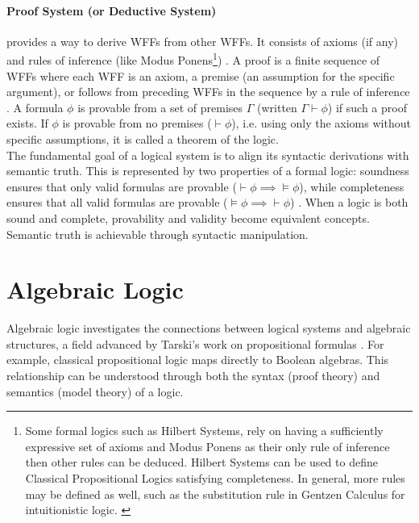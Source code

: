 \paragraph{Proof System (or Deductive System)} provides a way to derive WFFs from other WFFs. It consists of axioms (if any) and rules of inference (like Modus Ponens\footnote{Some formal logics such as Hilbert Systems, rely on having a sufficiently expressive set of axioms and Modus Ponens as their only rule of inference then other rules can be deduced\cite[Sec.~1.2, Def.~1.2.6]{Hajek1998}. Hilbert Systems can be used to define Classical Propositional Logics satisfying completeness. In general, more rules may be defined as well, such as the substitution rule in Gentzen Calculus for intuitionistic logic. \cite[p.~39]{ResiduatedLattices2007}}) \cite[Sec.~5.1, 5.3]{Agler2013SymbolicLogic}. A proof is a finite sequence of WFFs where each WFF is an axiom, a premise (an assumption for the specific argument), or follows from preceding WFFs in the sequence by a rule of inference \cite[Sec.~5.1]{Agler2013SymbolicLogic}. A formula $\phi$ is provable from a set of premises $\Gamma$ (written $\Gamma \vdash \phi$) if such a proof exists. If $\phi$ is provable from no premises ($\vdash \phi$), i.e. using only the axioms without specific assumptions, it is called a theorem of the logic.\\

The fundamental goal of a logical system is to align its syntactic derivations with semantic truth. This is represented by two properties of a formal logic: soundness ensures that only valid formulas are provable ($\vdash \phi \implies \models \phi$), while completeness ensures that all valid formulas are provable ($\models \phi \implies \vdash \phi$) \cite[Lemmas~1.2.7, 1.2.9]{Hajek1998}. When a logic is both sound and complete, provability and validity become equivalent concepts. Semantic truth is achievable through syntactic manipulation.\cite[Thm.~1.2.11]{Hajek1998}




\section{Algebraic Logic}
\label{app:alg_log}
Algebraic logic investigates the connections between logical systems and algebraic structures, a field advanced by Tarski's work on propositional formulas \cite[p.~1]{BlokPigozzi1989}.  For example, classical propositional logic maps directly to Boolean algebras. This relationship can be understood through both the syntax (proof theory) and semantics (model theory) of a logic.

